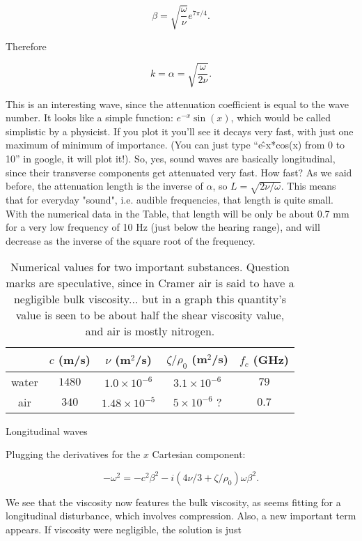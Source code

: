 \[ \beta =\sqrt{ \frac{\omega}{ \nu}}e^{ 7 \pi/4}.\]

Therefore

\[ k=\alpha =\sqrt{ \frac{\omega}{ 2 \nu}}.\]

This is an interesting wave, since the attenuation coefficient is
equal to the wave number. It looks like a simple function: $
e^{-x}\sin(x)$, which would be called simplistic by a physicist. If
you plot it you'll see it decays very fast, with just one maximum of
minimum of importance. (You can just type ``e\^-x*cos(x) from 0 to 10''
in google, it will plot it!). So, yes, sound waves are basically
longitudinal, since their transverse components get attenuated very
fast. How fast? As we said before, the attenuation length is the
inverse of $ \alpha$, so $ L=\sqrt{2\nu/\omega}$. This means that for
everyday "sound", i.e. audible frequencies, that length is quite
small. With the numerical data in the Table, that length will be only
be about 0.7 mm for a very low frequency of 10 Hz (just below the
hearing range), and will decrease as the inverse of the square root of
the frequency.

\begin{table}
\begin{tabular}{|c|c|c|c|c|}
  \hline
    & $ c$ (m/s) &  $ \nu$ (m$^2$/s) & $\zeta/\rho_0$ (m$^2$/s) & $ f_c$ (GHz)\\
  \hline
  \hline
  water & $1480$& $ 1.0 \times 10^{-6}$ & $ 3.1 \times 10^{-6}$ & $79$ \\
  \hline
  air & $340$   & $ 1.48\times 10^{-5}$ & $ 5 \times 10^{-6}$ ? & $0.7$ \\
  \hline
\end{tabular}
\caption{Numerical values for two important substances. Question marks
  are speculative, since in Cramer air is said to have a negligible
  bulk viscosity... but in a graph this quantity's value is seen to be
  about half the shear viscosity value, and air is mostly nitrogen.}
\end{table}

Longitudinal waves

Plugging the derivatives for the $x$ Cartesian component:

\[ -\omega^2 = - c^2\beta^2 - i (4\nu/3+\zeta/\rho_0)  \omega \beta^2.\]

We see that the viscosity now features the bulk viscosity, as seems
fitting for a longitudinal disturbance, which involves
compression. Also, a new important term appears. If viscosity were
negligible, the solution is just

